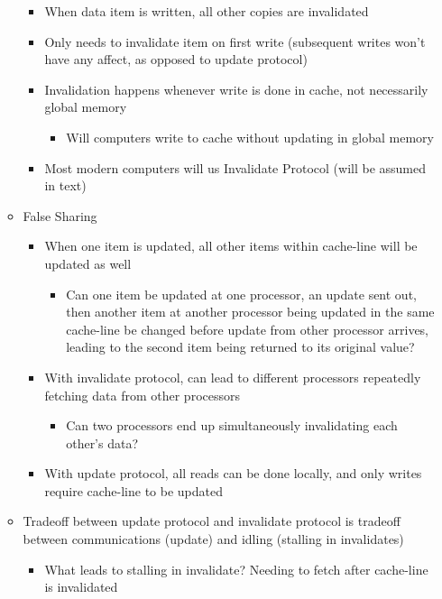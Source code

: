 \documentclass[a4paper]{article}
\begin{document}
\begin{itemize}
\begin{itemize}
\begin{itemize}
          \item When data item is written, all other copies are invalidated
          \item Only needs to invalidate item on first write (subsequent writes won't have any affect, as opposed to update protocol)
          \item Invalidation happens whenever write is done in cache, not necessarily global memory
            \begin{itemize}
              \item \color{red} Will computers write to cache without updating in global memory
            \end{itemize}
          \item Most modern computers will us Invalidate Protocol (will be assumed in text)
        \end{itemize}
      \item False Sharing
        \begin{itemize}
          \item When one item is updated, all other items within cache-line will be updated as well
            \begin{itemize}
              \item \color{red} Can one item be updated at one processor, an update sent out, then another item at another processor being updated in
                the same cache-line be changed before update from other processor arrives, leading to the second item being returned to its original
                value?
            \end{itemize}
          \item With invalidate protocol, can lead to different processors repeatedly fetching data from other processors
            \begin{itemize}
              \item \color{red} Can two processors end up simultaneously invalidating each other's data?
            \end{itemize}
          \item With update protocol, all reads can be done locally, and only writes require cache-line to be updated
        \end{itemize}
      \item Tradeoff between update protocol and invalidate protocol is tradeoff between communications (update) and idling (stalling in invalidates)
        \begin{itemize}
          \item { \color{red} What leads to stalling in invalidate? } Needing to fetch after cache-line is invalidated

\end{itemize}
\end{itemize}
\end{itemize}
\end{document}
